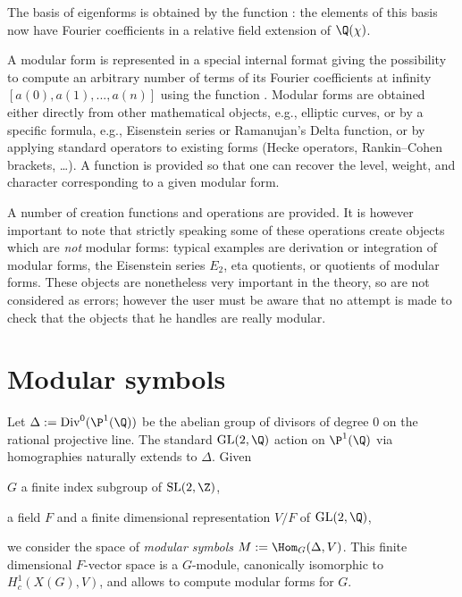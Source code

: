 The basis of eigenforms is obtained by the function :
the elements of this basis now have Fourier coefficients in a relative field
extension of $\Q(\chi)$.


A modular form is represented in a special internal format giving the
possibility to compute an arbitrary number of terms of its Fourier coefficients
at infinity $[a(0),a(1),...,a(n)]$ using the function . Modular
forms are obtained either directly from other mathematical objects, e.g.,
elliptic curves, or by a specific formula, e.g., Eisenstein series or
Ramanujan's Delta function, or by applying standard operators to existing forms
(Hecke operators, Rankin--Cohen brackets, \dots). A function  is
provided so that one can recover the level, weight, and character corresponding
to a given modular form.

A number of creation functions and operations are provided. It is however
important to note that strictly speaking some of these operations create
objects which are \emph{not} modular forms: typical examples are
derivation or integration of modular forms, the Eisenstein series $E_2$, eta
quotients, or quotients of modular forms. These objects are nonetheless very
important in the theory, so are not considered as errors; however the user must
be aware that no attempt is made to check that the objects that he handles are
really modular.


\section{Modular symbols}

Let $\Delta := \text{Div}^0(\P^1(\Q))$ be the abelian group of divisors of
degree $0$ on the rational projective line. The standard $\text{GL}(2,\Q)$
action on $\P^1(\Q)$ via homographies naturally extends to $\Delta$. Given

\item $G$ a finite index subgroup of $\text{SL}(2,\Z)$,

\item a field $F$ and a finite dimensional representation $V/F$ of
  $\text{GL}(2,\Q)$,

\noindent we consider the space of \emph{modular symbols} $M :=
\Hom_G(\Delta, V)$. This finite dimensional $F$-vector
space is a $G$-module, canonically isomorphic to $H^1_c(X(G), V)$,
and allows to compute modular forms for $G$.

